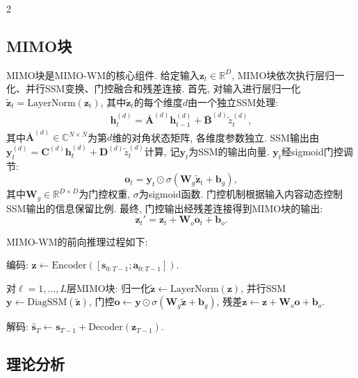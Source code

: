 \begin{multicols}{2}
\subsection{MIMO块}

\begin{Def}
MIMO块是MIMO-WM的核心组件.
给定输入${\bm z}_t \in \mathbb{R}^D$, MIMO块依次执行层归一化、并行SSM变换、门控融合和残差连接.
首先, 对输入进行层归一化$\tilde{{\bm z}}_t = \text{LayerNorm}({\bm z}_t)$,
其中$\tilde{{\bm z}}_t$的每个维度$d$由一个独立SSM处理:
\begin{eqnarray}
{\bm h}_t^{(d)} = \bar{{\bm A}}^{(d)}{\bm h}_{t-1}^{(d)} + \bar{{\bm B}}^{(d)}\tilde{z}_t^{(d)},
\end{eqnarray}
其中$\bar{{\bm A}}^{(d)} \in \mathbb{C}^{N \times N}$为第$d$维的对角状态矩阵, 各维度参数独立.
SSM输出由${\bm y}_t^{(d)} = {\bm C}^{(d)}{\bm h}_t^{(d)} + {\bm D}^{(d)}\tilde{z}_t^{(d)}$计算, 记${\bm y}_t$为SSM的输出向量. ${\bm y}_t$经sigmoid门控调节:
\begin{equation}
{\bm o}_t = {\bm y}_t \odot \sigma({\bm W}_g\tilde{{\bm z}}_t + {\bm b}_g),
\end{equation}
其中${\bm W}_g \in \mathbb{R}^{D \times D}$为门控权重, $\sigma$为sigmoid函数.
门控机制根据输入内容动态控制SSM输出的信息保留比例.
最终, 门控输出经残差连接得到MIMO块的输出:
\begin{equation}
{\bm z}_t' = {\bm z}_t + {\bm W}_o{\bm o}_t + {\bm b}_o.
\end{equation}
\end{Def}

MIMO-WM的前向推理过程如下:
\begin{Ste}编码: ${\bm z} \leftarrow \text{Encoder}([{\bm s}_{0:T{-}1}; {\bm a}_{0:T{-}1}])$.\end{Ste}
\begin{Ste}对$\ell = 1, \ldots, L$层MIMO块:
归一化$\tilde{{\bm z}} \leftarrow \text{LayerNorm}({\bm z})$,
并行SSM${\bm y} \leftarrow \text{DiagSSM}(\tilde{{\bm z}})$,
门控${\bm o} \leftarrow {\bm y} \odot \sigma({\bm W}_g\tilde{{\bm z}} + {\bm b}_g)$,
残差${\bm z} \leftarrow {\bm z} + {\bm W}_o{\bm o} + {\bm b}_o$.\end{Ste}
\begin{Ste}解码: $\hat{{\bm s}}_T \leftarrow {\bm s}_{T{-}1} + \text{Decoder}({\bm z}_{T{-}1})$.\end{Ste}

\subsection{理论分析}
    

\end{multicols}
